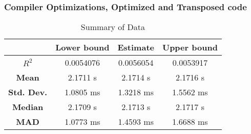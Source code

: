 \subsubsection{Compiler Optimizations, Optimized and Transposed code}
\begin{table}[H]
\centering
\begin{tabular}{|c|c|c|c|}
\hline
\textbf{} & \textbf{Lower bound} & \textbf{Estimate} & \textbf{Upper bound} \\
\hline
\textbf{$R^2$} & 0.0054076 & 0.0056054 & 0.0053917 \\
\hline
\textbf{Mean} & 2.1711 s & 2.1714 s & 2.1716 s \\
\hline
\textbf{Std. Dev.} & 1.0805 ms & 1.3218 ms & 1.5562 ms \\
\hline
\textbf{Median} & 2.1709 s & 2.1713 s & 2.1717 s \\
\hline
\textbf{MAD} & 1.0773 ms & 1.4593 ms & 1.6688 ms \\
\hline
\end{tabular}
\caption{Summary of Data}
\label{tab:data_summary_7}
\end{table}

